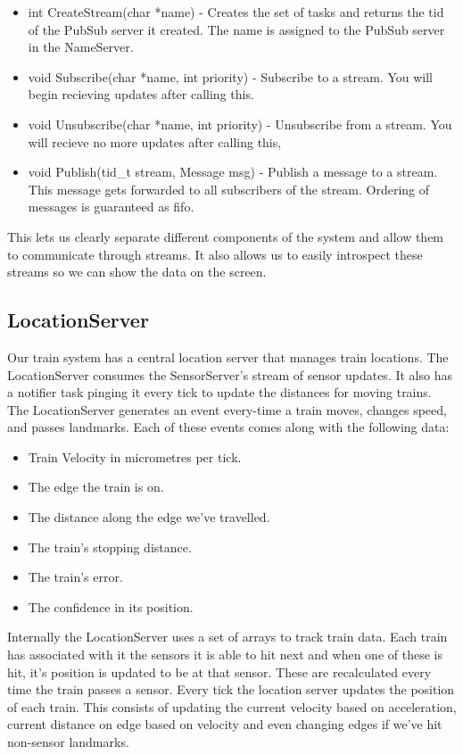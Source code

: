 \documentclass{article}
\begin{document}
\begin{itemize}
  \item int CreateStream(char *name) - Creates the set of tasks and returns the tid of the PubSub server it created. The name is assigned to the PubSub server in the NameServer.
  \item void Subscribe(char *name, int priority) - Subscribe to a stream. You will begin recieving updates after calling this.
  \item void Unsubscribe(char *name, int priority) - Unsubscribe from a stream. You will recieve no more updates after calling this,
  \item void Publish(tid\_t stream, Message msg) - Publish a message to a stream. This message gets forwarded to all subscribers of the stream. Ordering of messages is guaranteed as fifo.
\end{itemize}

This lets us clearly separate different components of the system and allow them to communicate through streams. It also allows us to easily introspect these streams so we can show the data on the screen.


\subsection{LocationServer}

Our train system has a central location server that manages train locations. The LocationServer consumes the SensorServer's stream of sensor updates. It also has a notifier task pinging it every tick to update the distances for moving trains. The LocationServer generates an event every-time a train moves, changes speed, and passes landmarks. Each of these events comes along with the following data:

\begin{itemize}
    \item Train Velocity in micrometres per tick.
    \item The edge the train is on.
    \item The distance along the edge we've travelled.
    \item The train's stopping distance.
    \item The train's error.
    \item The confidence in its position.
\end{itemize}

Internally the LocationServer uses a set of arrays to track train data. Each train has associated with it the sensors it is able to hit next and when one of these is hit, it's position is updated to be at that sensor. These are recalculated every time the train passes a sensor. Every tick the location server updates the position of each train. This consists of updating the current velocity based on acceleration, current distance on edge based on velocity and even changing edges if we've hit non-sensor landmarks.
\end{document}
